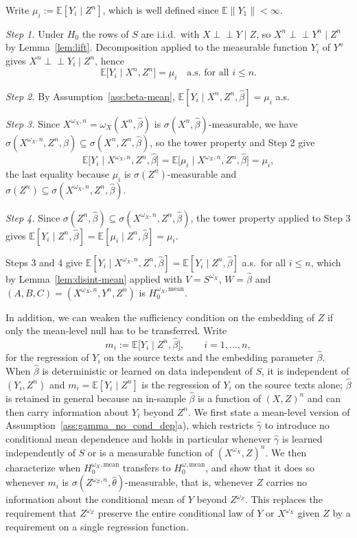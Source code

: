 \documentclass[twoside,11pt]{article}
\newcommand{\indep}{\perp \!\!\! \perp}
\begin{document}
\begin{proofE}
Write $\mu_i:=\mathbb E[Y_i\mid Z^n]$, which is well defined since
$\mathbb E\|Y_1\|<\infty$.

\emph{Step 1.} Under $H_0$ the rows of $S$ are i.i.d.\ with $X\indep Y\mid Z$, so
$X^n\indep Y^n\mid Z^n$ by Lemma~\ref{lem:lift}. Decomposition applied to the
measurable function $Y_i$ of $Y^n$ gives $X^n\indep Y_i\mid Z^n$, hence
\[
  \mathbb E\big[Y_i\mid X^n,Z^n\big]=\mu_i\quad\text{a.s. for all } i\le n .
\]

\emph{Step 2.} By Assumption~\ref{ass:beta-mean},
$\mathbb E[Y_i\mid X^n,Z^n,\hat\beta]=\mu_i$ a.s.

\emph{Step 3.} Since $X^{\omega_X,n}=\omega_X(X^n,\hat\beta)$ is
$\sigma(X^n,\hat\beta)$-measurable, we have
$\sigma(X^{\omega_X,n},Z^n,\hat\beta)\subseteq\sigma(X^n,Z^n,\hat\beta)$, so the tower
property and Step 2 give
\[
  \mathbb E\big[Y_i\mid X^{\omega_X,n},Z^n,\hat\beta\big]
  =\mathbb E\big[\mu_i\mid X^{\omega_X,n},Z^n,\hat\beta\big]=\mu_i ,
\]
the last equality because $\mu_i$ is $\sigma(Z^n)$-measurable and
$\sigma(Z^n)\subseteq\sigma(X^{\omega_X,n},Z^n,\hat\beta)$.

\emph{Step 4.} Since $\sigma(Z^n,\hat\beta)\subseteq\sigma(X^{\omega_X,n},Z^n,\hat\beta)$,
the tower property applied to Step 3 gives
$\mathbb E[Y_i\mid Z^n,\hat\beta]=\mathbb E[\mu_i\mid Z^n,\hat\beta]=\mu_i$.

Steps 3 and 4 give $\mathbb E[Y_i\mid X^{\omega_X,n},Z^n,\hat\beta]
=\mathbb E[Y_i\mid Z^n,\hat\beta]$ a.s.\ for all $i\le n$, which by
Lemma~\ref{lem:disint-mean} applied with $V=S^{\omega_X}$, $W=\hat\beta$ and
$(A,B,C)=(X^{\omega_X,n},Y^n,Z^n)$ is $H_0^{\omega_X,\mathrm{mean}}$.
\end{proofE}

In addition, we can weaken the sufficiency condition on the embedding of $Z$ if only the mean-level null has to be transferred. 
Write 
\[
  m_i:=\mathbb E\big[Y_i\mid Z^n,\hat\beta\big],\qquad i=1,\dots,n,
\]
for the regression of $Y_i$ on the source texts and the embedding parameter $\hat\beta$. When $\hat\beta$ is deterministic or learned on data independent of $S$, it is independent of $(Y_i,Z^n)$ and $m_i=\mathbb E[Y_i\mid Z^n]$ is the regression of $Y_i$ on the source texts alone; $\hat\beta$ is retained in general because an in-sample $\hat\beta$ is a function of $(X,Z)^n$ and can then carry information about $Y_i$ beyond $Z^n$. 
We first state a mean-level version of Assumption~\ref{ass:gamma_no_cond_dep}a), which restricts $\hat\gamma$ to introduce no conditional mean dependence and holds in particular whenever $\hat\gamma$ is learned independently of $S$ or is a measurable function of $(X^{\omega_X},Z)^n$. 
We then characterize when $H_0^{\omega_X,\mathrm{mean}}$ transfers to $H_0^{\omega,\mathrm{mean}}$, and show that it does so whenever $m_i$ is $\sigma(Z^{\omega_Z,n},\hat\theta)$-measurable, that is, whenever $Z$ carries no information about the conditional mean of $Y$ beyond $Z^{\omega_Z}$. 
This replaces the requirement that $Z^{\omega_Z}$ preserve the entire conditional law of $Y$ or $X^{\omega_X}$ given $Z$ by a requirement on a single regression function.
\end{document}
